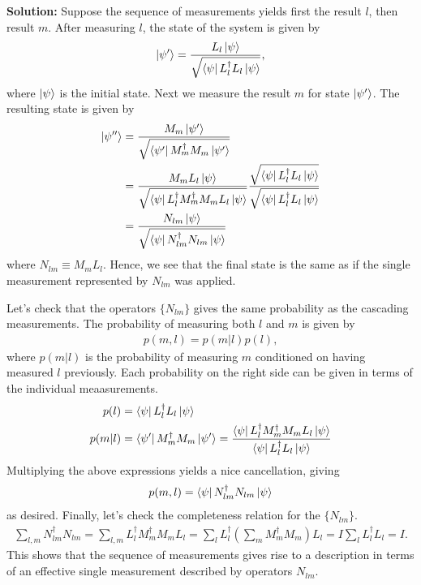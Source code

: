 \documentclass{book}
\begin{document}
	\textbf{Solution:} Suppose the sequence of measurements yields first the result $l$, then result $m$. After measuring $l$, the state of the system is given by 
	\begin{align}
		\ket{\psi'} = \frac{L_l \ket{\psi}}{\sqrt{\bra{\psi}L_l^\dagger L_l \ket{\psi}}},
	\end{align}
	where $\ket{\psi}$ is the initial state. Next we measure the result $m$ for state $\ket{\psi'}$. The resulting state is given by 
	\begin{align}
	\begin{aligned}
		\ket{\psi''} &= \frac{M_m \ket{\psi'}}{\sqrt{\bra{\psi'}M_m^\dagger M_m \ket{\psi'}}} \\
		&= \frac{M_m L_l \ket{\psi}}{\sqrt{\bra{\psi}L_l^\dagger M_m^\dagger M_m L_l\ket{\psi}}} \frac{\sqrt{\bra{\psi} L_l^\dagger L_l \ket{\psi}}}{\sqrt{\bra{\psi} L_l^\dagger L_l \ket{\psi}}} \\
		&= \frac{N_{lm}\ket{\psi}}{\sqrt{\bra{\psi}N_{lm}^\dagger N_{lm}\ket{\psi}}}
	\end{aligned}
	\end{align}
	where $N_{lm} \equiv M_m L_l$. Hence, we see that the final state is the same as if the single measurement represented by $N_{lm}$ was applied. 
	
	Let's check that the operators $\{N_{lm}\}$ gives the same probability as the cascading measurements. The probability of measuring both $l$ and $m$ is given by 
	\begin{align}
		p(m,l) = p(m|l) p(l),
	\end{align}
	where $p(m|l)$ is the probability of measuring $m$ conditioned on having measured $l$ previously. Each probability on the right side can be given in terms of the individual meaasurements.
	\begin{align}
	\begin{aligned}
		p(l) &= \bra{\psi}L_l^\dagger L_l \ket{\psi} \\
		p(m|l) &=\bra{\psi'} M_m^\dagger M_m \ket{\psi'} = \frac{\bra{\psi} L_l^\dagger M_m^\dagger M_m L_l \ket{\psi}}{\bra{\psi}L_l^\dagger L_l \ket{\psi}}
	\end{aligned}
	\end{align}
	Multiplying the above expressions yields a nice cancellation, giving
	\begin{align}
		p(m,l) = \bra{\psi} N_{lm}^\dagger N_{lm} \ket{\psi}
	\end{align}
	as desired. Finally, let's check the completeness relation for the $\{N_{lm}\}$.
	\begin{align}
		\sum_{l,m} N_{lm}^\dagger N_{lm} = \sum_{l,m}L_l^\dagger M_m^\dagger M_m L_l =  \sum_l L_l^\dagger (\sum_m M_m^\dagger M_m) L_l = I \sum_l L_l^\dagger L_l = I.
	\end{align}
	This shows that the sequence of measurements gives rise to a description in terms of an effective single measurement described by operators $N_{lm}$. 
\end{document}
